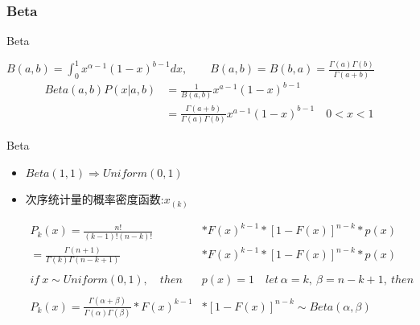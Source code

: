 \documentclass{beamer}
\begin{document}
\begin{CJK*}{UTF8}{gbsn}
\subsubsection{Beta}
\begin{frame}{Beta}
\begin{small}
 $
B(a,b)=\int_0^1x^{\alpha-1}(1-x)^{b-1}dx,\qquad B(a,b)=B(b,a)=\frac{\Gamma(a)\Gamma(b)}{\Gamma(a+b)}
$
\begin{align*}
Beta(a,b)P(x|a,b)&=\frac{1}{B(a,b)}x^{a-1}(1-x)^{b-1}\\ &=\frac{\Gamma(a+b)}{\Gamma(a)\Gamma(b)}x^{a-1}(1-x)^{b-1}\quad 0<x<1
\end{align*}
\end{small}
\end{frame}

\begin{frame}{Beta}
\begin{itemize}
	\item $Beta(1,1)\Longrightarrow Uniform(0,1)$
	\item 次序统计量的概率密度函数:\qquad $x_{(k)}$\\
	\begin{small}
		\begin{align*}
		P_k(x)=\frac{n!}{{(k-1)!(n-k)!}}&*F(x)^{k-1}*[1-F(x)]^{n-k}*p(x)\\
		=\frac{\Gamma(n+1)}{{\Gamma(k)\Gamma(n-k+1)}}&*F(x)^{k-1}*[1-F(x)]^{n-k}*p(x)\\
		\\
		if\ x\sim Uniform(0,1),\quad then\ &p(x)=1\quad let\ \alpha=k,\ \beta=n-k+1,\ then\\
		\\
		P_k(x)=\frac{\Gamma(\alpha+\beta)}{{\Gamma(\alpha)\Gamma(\beta)}}*F(x)^{k-1}&*[1-F(x)]^{n-k}\sim Beta(\alpha,\beta)
		\end{align*}
		\end{small}
\end{itemize}
\end{frame}


\end{CJK*}
\end{document}
